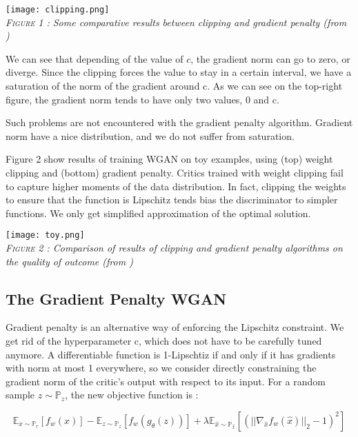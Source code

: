 \documentclass[a4paper]{article}
\newcommand{\Expec}{\mathbb{E}}
\newcommand{\Prob}{\mathbb{P}}
\theoremstyle{plain}
\theoremstyle{remark}
\theoremstyle{definition}
\begin{document}
\begin{center}
\label{fig:1}
	\texttt{[image: clipping.png]} \\
    \emph{\textsc{Figure 1 :} Some comparative results between clipping and gradient penalty (from \cite{gulrajani2017improved})}
\end{center} 

We can see that depending of the value of $c$, the gradient norm can go to zero, or diverge. Since the clipping forces the value to stay in a certain interval, we have a saturation of the norm of the gradient around c. As we can see on the top-right figure, the gradient norm tends to have only two values, 0 and c.

Such problems are not encountered with the gradient penalty algorithm. Gradient norm have a nice distribution, and we do not suffer from saturation.

Figure 2 show results of training WGAN on toy examples, using (top) weight clipping
and (bottom) gradient penalty. Critics trained with weight clipping fail to capture higher moments of the data distribution. In fact, clipping the weights to ensure that the function is Lipschitz tends bias the discriminator to simpler functions. We only get simplified approximation of the optimal solution.

\begin{center}
	\texttt{[image: toy.png]} \\
    \emph{\textsc{Figure 2 :} Comparison of results of clipping and gradient penalty algorithms on the quality of outcome (from \cite{gulrajani2017improved})}
\end{center} 

\subsection{The Gradient Penalty WGAN}

Gradient penalty is an alternative way of enforcing the Lipschitz constraint. We get rid of the hyperparameter c, which does not have to be carefully tuned anymore.
A differentiable function is 1-Lipschtiz if and only if it has gradients with norm at most 1 everywhere, so we consider directly constraining the gradient norm of the critic’s output with respect to its input.
For a random sample $z \sim \Prob_z$, the new objective function is :

\begin{equation}
\label{eq:grad_pen}
\Expec_{x \sim \Prob_r} [f_w(x)] - \Expec_{z \sim \Prob_z} [f_w(g_\theta(z))] + \lambda
 \Expec_{\hat{x} \sim \Prob_{\hat{x}}} [ (||\nabla_{\hat{x}} f_w(\hat{x})||_2 -1)^2] 
\end{equation}
\end{document}
